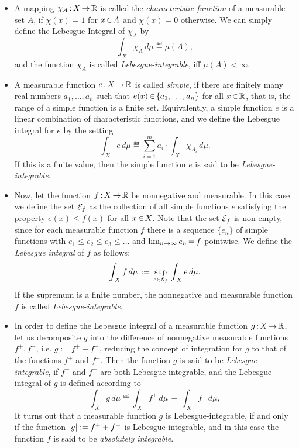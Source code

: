 \documentclass[11pt,twoside]{article}
\begin{document}
\begin{itemize}[leftmargin=12pt,itemsep=2pt]
\item[1.]
A mapping $\chi_A \: X \xto \R$ is called the \textit{characteristic function}
of a measurable set $A$,
if $\chi(x)=1$ for $x \xeof A$ and $\chi(x)=0$ otherwise.
We can simply define the Lebesgue-Integral of $\chi_A$ by
\[
\int_{\,X} \chi_A \, d \mu \eqdef \mu(A),
\]
and the function $\chi_A$ is called \textit{Lebesgue-integrable},
iff $\mu(A) < \infty$.

\item[2.]
A measurable function $e \: X \xto \R$ is called \textit{simple},
if there are finitely many real numbers $a_1,\ldots,a_n$
such that $e(x) \xeof \{a_1,\ldots,a_n\}$ for all $x \xeof \R$,
that is, the range of a simple function is a finite set.
Equivalently,
a simple function $e$ is a linear combination of characteristic functions,
and we define the Lebesgue integral for $e$ by the setting
\[
\int_{\,X} e \, d \mu \eqdef
\sum_{i=1}^m a_i \cdot \int_{\,X} \chi_{A_i} \, d \mu.
\]
If this is a finite value,
then the simple function $e$ is said to be \textit{Lebesgue-integrable}.

\item[3.]
Now,
let the function $f \: X \xto \R$ be nonnegative and measurable.
In this case we define the set $\cal{E}_f$ as the collection
of all simple functions $e$ satisfying the property $e(x) \leq f(x)$
for all $x \xeof X$.
Note
that the set $\cal{E}_f$ is non-empty,
since for each measurable function $f$
there is a sequence $\{e_n\}$ of simple functions with
$e_1 \leq e_2 \leq e_3 \leq \ldots$ and
$\lim_{n \to \infty} e_n \eq f$ pointwise.
We define the \textit{Lebesgue integral} of $f$ as follows:
\[
\int_{\,X} f \, d \mu
\eqdef
\sup_{e \in \cal{E}_f} \, \int_{\,X} e \, d \mu.
\]
If the supremum is a finite number,
the nonnegative and measurable function $f$ is called
\textit{Lebesgue-integrable}.

\item[4.]
In order to define the Lebesgue integral
of a measurable function $g \: X \xto \R$,
let us decomposite $g$ into the difference of nonnegative measurable functions
$f^+, f^-$, i.e. $g := f^+ - f^-$,
reducing the concept of integration for $g$
to that of the functions $f^+$ and $f^-$.
Then the function $g$ is said to be \textit{Lebesgue-integrable},
if $f^+$ and $f^-$ are both Lebesgue-integrable,
and the Lebesgue integral of $g$ is defined according to
\[
\int_{\,X} g \, d \mu \eqdef
\int_{\,X} f^+ \, d \mu \, - \, \int_{\,X} f^- \, d \mu,
\]
It turns out that a measurable function $g$ is Lebesgue-integrable,
if and only if the function $\abs{g} := f^+ + f^-$ is Lebesgue-integrable,
and in this case the function $f$ is said to be \textit{absolutely integrable}.
\end{itemize}
\end{document}
